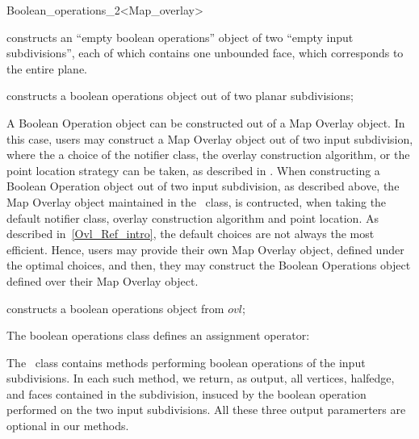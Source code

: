 \begin{ccRefClass}{Boolean_operations_2<Map_overlay>}
\ccCreation
    
   {constructs an
     ``empty boolean operations'' object of two ``empty input subdivisions'', 
     each of which contains one unbounded face, which corresponds to the entire plane.}
  
  {constructs a boolean operations object out of two planar subdivisions;}
  

\begin{ccAdvanced}


A Boolean Operation object can be constructed out of a Map Overlay object.
In this case, users may construct a Map Overlay object out of two input subdivision, 
where the a choice of the notifier class, the overlay construction algorithm, or the point location strategy 
can be taken, as described in . 
When constructing a Boolean Operation object out of two input subdivision, as described above,
the Map Overlay object maintained in the \ccClassTemplateName\ class,
is contructed, when taking the default notifier class, overlay construction algorithm and point location.
As described in~\ref{Ovl_Ref_intro}, the default choices are not always 
the most efficient. Hence, users may provide their own Map Overlay object, defined under the optimal choices, 
and then, they may construct the Boolean Operations object defined over their Map Overlay object. 

{constructs a boolean operations object from $ovl$;}

\end{ccAdvanced}

The boolean operations class defines an assignment operator:


The \ccClassTemplateName\ class contains methods performing 
boolean operations of the input subdivisions.
In each such method, we return, as output, all vertices, halfedge, and faces 
contained in the subdivision, insuced by the boolean operation performed 
on the two input subdivisions. All these three output paramerters are optional 
in our methods.


\end{ccRefClass}
